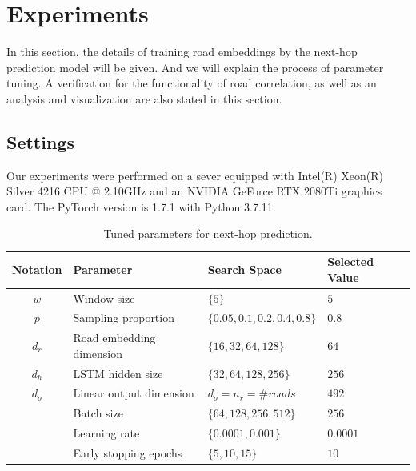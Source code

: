 
\section{Experiments}
In this section, the details of training road embeddings by the next-hop prediction model will be given. And we will explain the process of parameter tuning. A verification for the functionality of road correlation, as well as an analysis and visualization are also stated in this section.

\subsection{Settings}
Our experiments were performed on a sever equipped with Intel(R) Xeon(R) Silver 4216 CPU @ 2.10GHz and an NVIDIA GeForce RTX 2080Ti graphics card. The PyTorch\cite{pytorch} version is 1.7.1 with Python 3.7.11.

\begin{table}[htb]
    \begin{center}
        \caption{Tuned parameters for next-hop prediction.}
        \label{next-hop_params}
        \begin{tabular}{clll}
            \toprule

            \textbf{Notation} & \textbf{Parameter}       & \textbf{Search Space}          & \textbf{Selected Value} \\

            \midrule

            $w$               & Window size              & $\{5 \}$                       & $5$                     \\
            $p$               & Sampling proportion      & $\{0.05, 0.1, 0.2, 0.4, 0.8\}$ & $0.8$                   \\
            $d_r$             & Road embedding dimension & $\{16, 32, 64, 128 \}$         & $64$                    \\
            $d_h$             & LSTM hidden size         & $\{32, 64, 128, 256 \}$        & $256$                   \\
            $d_o$             & Linear output dimension  & $d_o=n_r=\#roads$              & $492$                   \\
            ~                 & Batch size               & $\{64, 128, 256, 512 \}$       & $256$                   \\
            ~                 & Learning rate            & $\{0.0001, 0.001\}$            & $0.0001$                \\
            ~                 & Early stopping epochs    & $\{5, 10, 15\}$                & $10$                    \\

            \bottomrule
        \end{tabular}
    \end{center}
\end{table}

